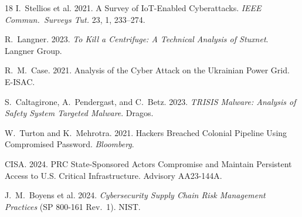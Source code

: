 \documentclass[sigconf,nonacm]{acmart}
\begin{document}
\begin{thebibliography}{18}
I.~Stellios et al. 2021. A Survey of IoT-Enabled Cyberattacks.
\textit{IEEE Commun.\ Surveys Tut.} 23, 1, 233--274.

R.~Langner. 2023. \textit{To Kill a Centrifuge: A Technical Analysis of Stuxnet}.
Langner Group.

R.~M.~Case. 2021. Analysis of the Cyber Attack on the Ukrainian Power Grid. E-ISAC.

S.~Caltagirone, A.~Pendergast, and C.~Betz. 2023. \textit{TRISIS Malware: Analysis of
Safety System Targeted Malware}. Dragos.

W.~Turton and K.~Mehrotra. 2021. Hackers Breached Colonial Pipeline Using Compromised
Password. \textit{Bloomberg}.

CISA. 2024. PRC State-Sponsored Actors Compromise and Maintain Persistent Access to
U.S. Critical Infrastructure. Advisory AA23-144A.

J.~M.~Boyens et al. 2024. \textit{Cybersecurity Supply Chain Risk Management Practices}
(SP 800-161 Rev.~1). NIST.

\end{thebibliography}
\end{document}
